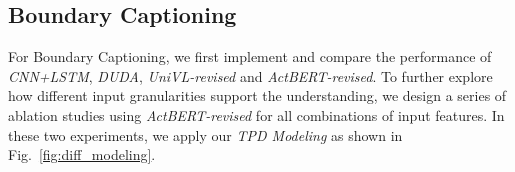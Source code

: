 \documentclass[runningheads]{llncs}
\begin{document}
\begin{table}[t]
\begin{center}
\caption{Performance of Different Methods in Boundary Captioning. For \textit{UniVL-revised} and \textit{ActBERT-revised}, we apply the \textit{TPD Modeling} and take the "ResNet-roi+TSN" combination as input feature}
\label{table:captioning_sota}
\end{center}
\end{table}
%
 \subsection{Boundary Captioning}
\label{experiment_captioning}
For Boundary Captioning, we first implement and compare the performance of \textit{CNN+LSTM}, \textit{DUDA}, \textit{UniVL-revised} and \textit{ActBERT-revised}. To further explore how different input granularities support the understanding, we design a series of ablation studies using \textit{ActBERT-revised} for all combinations of input features. In these two experiments, we apply our \textit{TPD Modeling} as shown in Fig.~\ref{fig:diff_modeling}.
\end{document}
